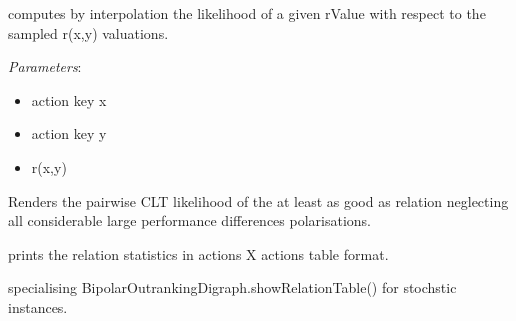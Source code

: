 \documentclass[letterpaper,10pt,english]{sphinxmanual}
\begin{document}
\begin{fulllineitems}
\begin{fulllineitems}
\label{techDoc:outrankingDigraphs.StochasticBipolarOutrankingDigraph.computeCDF}
computes by interpolation the likelihood of a given rValue with respect to the sampled r(x,y) valuations.

\emph{Parameters}:
\begin{itemize}
\item {} 
action key x

\item {} 
action key y

\item {} 
r(x,y)

\end{itemize}

\end{fulllineitems}


\begin{fulllineitems}
\label{techDoc:outrankingDigraphs.StochasticBipolarOutrankingDigraph.computeCLTLikelihoods}
Renders the pairwise CLT likelihood of the at least as good as relation
neglecting all considerable large performance differences polarisations.

\end{fulllineitems}


\begin{fulllineitems}
\label{techDoc:outrankingDigraphs.StochasticBipolarOutrankingDigraph.showRelationStatistics}
prints the relation statistics in actions X actions table format.

\end{fulllineitems}


\begin{fulllineitems}
\label{techDoc:outrankingDigraphs.StochasticBipolarOutrankingDigraph.showRelationTable}
specialising BipolarOutrankingDigraph.showRelationTable() for stochstic instances.

\end{fulllineitems}


\end{fulllineitems}
\end{document}
